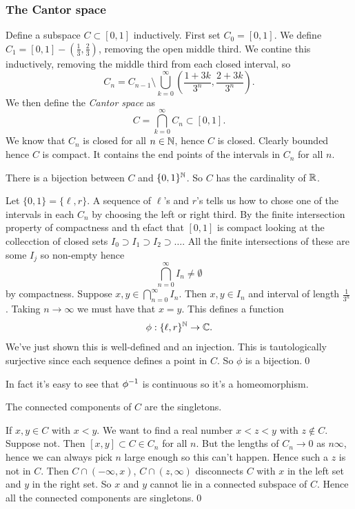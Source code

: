\documentclass{article}
\begin{document}
\subsubsection{The Cantor space}
Define a subspace $ C\subset [0,1] $ inductively. First set $ C_0 = [0,1] $.
We define $ C_1 = [0,1] - \left(\frac 13,\frac 23\right) $, removing the open middle third. We contine this inductively, removing the middle third from each closed interval, so
\[
	C_n = C_{n-1}\setminus \bigcup_{k=0}^\infty \left(\frac {1+3k}{3^n}, \frac{2+3k}{3^n}\right).
\]
We then define the \textit{Cantor space} as
\[
	C = \bigcap_{k=0}^\infty C_n \subset [0,1].
\]
We know that $ C_n $ is closed for all $ n\in \mathbb{N} $, hence $ C $ is closed. Clearly bounded hence $ C $ is compact. It contains the end points of the intervals in $ C_n $ for all $ n $.
\begin{proposition}
	There is a bijection between $ C $ and $ \{0,1\}^{\mathbb{N}} $. So $ C $ has the cardinality of $ \mathbb{R} $.
\end{proposition}
\pf Let $ \{0,1\}=\{\ell,r\} $. A sequence of $ \ell $'s and $ r $'s tells us how to chose one of the intervals in each $ C_n $ by choosing the left or right third. By the finite intersection property of compactness and th efact that $ [0,1] $ is compact looking at the collecction of closed sets $ I_0\supset I_1\supset I_2\supset \dots $. All the finite intersections of these are some $ I_j $ so non-empty hence 
\[
	\bigcap_{n=0}^\infty I_n \ne \emptyset
\]
by compactness. Suppose $ x,y\in \bigcap_{n=0}^\infty I_n $. Then $ x,y\in I_n $ and interval of length $ \frac 1{3^n} $. Taking $ n\to\infty $ we must have that $ x=y $. This defines a function 
\[
	\phi: \{\ell ,r\}^{\mathbb{N}} \to \mathbb{C}.
\]
We've just shown this is well-defined and an injection. This is tautologically surjective since each sequence defines a point in $ C $. So $ \phi $ is a bijection.\qed\par
In fact it's easy to see that $ {\phi}^{-1} $ is continuous so it's a homeomorphism.
\begin{proposition}
  The connected components of $ C $ are the singletons.
\end{proposition}
If $ x,y \in C $ with $ x<y $. We want to find a real number $ x<z<y $ with $ z\notin C $. Suppose not. Then $ [x,y]\subset C  \in C_n	$ for all $ n $. But the lengths of $ C_n\to 0 $ as $ n\infty $, hence we can always pick $ n $ large enough so this can't happen. Hence such a $ z $ is not in $ C $. Then $ C\cap (-\infty , x) $, $ C\cap (z,\infty) $ disconnects $ C $ with $ x $ in the left set and $ y $ in the right set. So $ x $ and $ y $ cannot lie in a connected subspace of $ C $. Hence all the connected components are singletons.\qed
\end{document}
